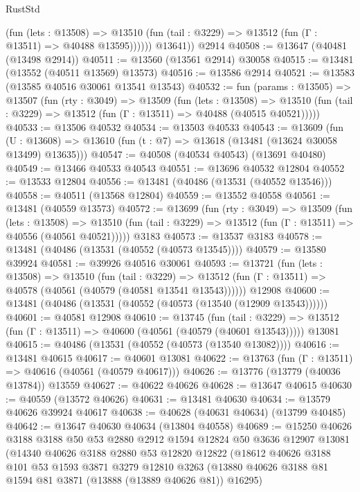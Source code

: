 \begin{lexlean}{RustStd}
\begin{coremodule}
              (fun (lets : @13508) =>
              @13510 (fun (tail : @3229) => @13512 (fun (Γ : @13511) => @40488 @13595))))))
        @13641))
    @2914
@40508 := @13647 (@40481 (@13498 @2914))
@40511 := @13560 (@13561 @2914) @30058
@40515 := @13481 (@13552 (@40511 @13569) @13573)
@40516 := @13586 @2914
@40521 := @13583 (@13585 @40516 @30061 @13541 @13543)
@40532 := fun (params : @13505) =>
  @13507
    (fun (rty : @3049) =>
    @13509
      (fun (lets : @13508) =>
      @13510 (fun (tail : @3229) => @13512 (fun (Γ : @13511) => @40488 (@40515 @40521)))))
@40533 := @13506 @40532
@40534 := @13503 @40533
@40543 := @13609
    (fun (U : @13608) => @13610 (fun (t : @7) => @13618 (@13481 (@13624 @30058 @13499) @13635)))
@40547 := @40508 (@40534 @40543) (@13691 @40480)
@40549 := @13466 @40533 @40543
@40551 := @13696 @40532 @12804
@40552 := @13533 @12804
@40556 := @13481 (@40486 (@13531 (@40552 @13546)))
@40558 := @40511 (@13568 @12804)
@40559 := @13552 @40558
@40561 := @13481 (@40559 @13573)
@40572 := @13699
    (fun (rty : @3049) =>
    @13509
      (fun (lets : @13508) =>
      @13510 (fun (tail : @3229) => @13512 (fun (Γ : @13511) => @40556 (@40561 @40521)))))
    @3183
@40573 := @13537 @3183
@40578 := @13481 (@40486 (@13531 (@40552 (@40573 @13545))))
@40579 := @13580 @39924
@40581 := @39926 @40516 @30061
@40593 := @13721
    (fun (lets : @13508) =>
    @13510
      (fun (tail : @3229) =>
      @13512 (fun (Γ : @13511) => @40578 (@40561 (@40579 (@40581 @13541 @13543))))))
    @12908
@40600 := @13481 (@40486 (@13531 (@40552 (@40573 (@13540 (@12909 @13543))))))
@40601 := @40581 @12908
@40610 := @13745
    (fun (tail : @3229) => @13512 (fun (Γ : @13511) => @40600 (@40561 (@40579 (@40601 @13543)))))
    @13081
@40615 := @40486 (@13531 (@40552 (@40573 (@13540 @13082))))
@40616 := @13481 @40615
@40617 := @40601 @13081
@40622 := @13763 (fun (Γ : @13511) => @40616 (@40561 (@40579 @40617)))
@40626 := @13776 (@13779 (@40036 @13784)) @13559
@40627 := @40622 @40626
@40628 := @13647 @40615
@40630 := @40559 (@13572 @40626)
@40631 := @13481 @40630
@40634 := @13579 @40626 @39924 @40617
@40638 := @40628 (@40631 @40634) (@13799 @40485)
@40642 := @13647 @40630 @40634 (@13804 @40558)
@40689 := @15250
    @40626
    @3188
    @3188
    @50
    @53
    @2880
    @2912
    @1594
    @12824
    @50
    @3636
    @12907
    @13081
    (@14340
      @40626
      @3188
      @2880
      @53
      @12820
      @12822
      (@18612
        @40626
        @3188
        @101
        @53
        @1593
        @3871
        @3279
        @12810
        @3263
        (@13880 @40626 @3188 @81 @1594 @81 @3871 (@13888 (@13889 @40626 @81)) @16295)

\end{coremodule}
\end{lexlean}
